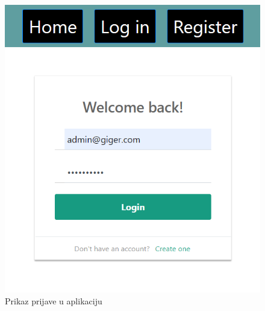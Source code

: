 			\begin{figure}[H]
				\begin{center}
					\includegraphics[width=15cm]{slike/login_screen.PNG}
				\end{center}
				\caption{Prikaz prijave u aplikaciju}
				\label{fig:inttest}
			\end{figure}
		
